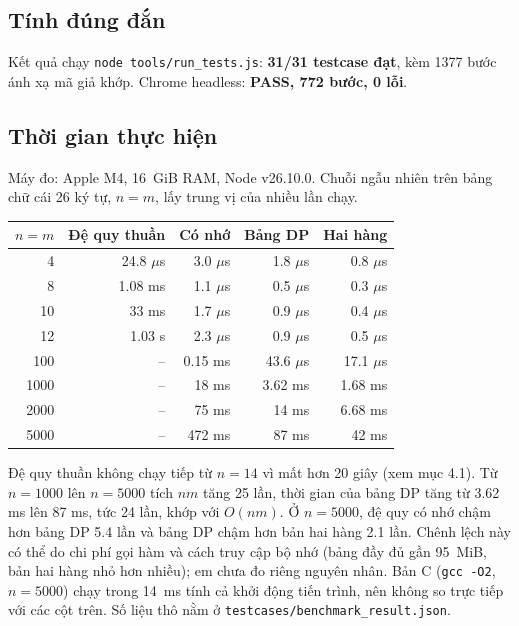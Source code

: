 \documentclass[12pt,a4paper]{article}
\newcommand{\code}[1]{\texttt{#1}}
\begin{document}
\subsection{Tính đúng đắn}
Kết quả chạy \code{node tools/run\_tests.js}: \textbf{31/31 testcase đạt}, kèm 1377 bước ánh xạ mã giả khớp. Chrome headless: \textbf{PASS, 772 bước, 0 lỗi}.

\subsection{Thời gian thực hiện}
Máy đo: Apple M4, 16~GiB RAM, Node v26.10.0. Chuỗi ngẫu nhiên trên bảng chữ cái 26 ký tự, $n=m$, lấy trung vị của nhiều lần chạy.
\begin{center}
\begin{tabular}{@{}rrrrr@{}}
\toprule
$n=m$ & Đệ quy thuần & Có nhớ & Bảng DP & Hai hàng\\
\midrule
4 & 24.8 $\mu$s & 3.0 $\mu$s & 1.8 $\mu$s & 0.8 $\mu$s\\
8 & 1.08 ms & 1.1 $\mu$s & 0.5 $\mu$s & 0.3 $\mu$s\\
10 & 33 ms & 1.7 $\mu$s & 0.9 $\mu$s & 0.4 $\mu$s\\
12 & 1.03 s & 2.3 $\mu$s & 0.9 $\mu$s & 0.5 $\mu$s\\
100 & -- & 0.15 ms & 43.6 $\mu$s & 17.1 $\mu$s\\
1000 & -- & 18 ms & 3.62 ms & 1.68 ms\\
2000 & -- & 75 ms & 14 ms & 6.68 ms\\
5000 & -- & 472 ms & 87 ms & 42 ms\\
\bottomrule
\end{tabular}
\end{center}
Đệ quy thuần không chạy tiếp từ $n=14$ vì mất hơn 20 giây (xem mục 4.1). Từ $n=1000$ lên $n=5000$ tích $nm$ tăng 25 lần, thời gian của bảng DP tăng từ 3.62 ms lên 87 ms, tức 24 lần, khớp với $O(nm)$. Ở $n=5000$, đệ quy có nhớ chậm hơn bảng DP 5.4 lần và bảng DP chậm hơn bản hai hàng 2.1 lần. Chênh lệch này có thể do chi phí gọi hàm và cách truy cập bộ nhớ (bảng đầy đủ gần 95~MiB, bản hai hàng nhỏ hơn nhiều); em chưa đo riêng nguyên nhân. Bản C (\code{gcc -O2}, $n=5000$) chạy trong 14~ms tính cả khởi động tiến trình, nên không so trực tiếp với các cột trên. Số liệu thô nằm ở \code{testcases/benchmark\_result.json}.
\end{document}
